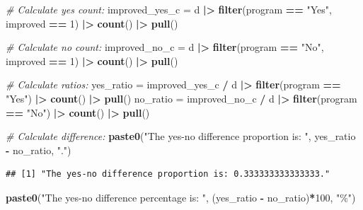 \documentclass[
]{article}
\newenvironment{Shaded}{\begin{snugshade}}{\end{snugshade}}
\newcommand{\CommentTok}[1]{\textcolor[rgb]{0.56,0.35,0.01}{\textit{#1}}}
\newcommand{\DecValTok}[1]{\textcolor[rgb]{0.00,0.00,0.81}{#1}}
\newcommand{\FunctionTok}[1]{\textcolor[rgb]{0.13,0.29,0.53}{\textbf{#1}}}
\newcommand{\NormalTok}[1]{#1}
\newcommand{\OtherTok}[1]{\textcolor[rgb]{0.56,0.35,0.01}{#1}}
\newcommand{\SpecialCharTok}[1]{\textcolor[rgb]{0.81,0.36,0.00}{\textbf{#1}}}
\newcommand{\StringTok}[1]{\textcolor[rgb]{0.31,0.60,0.02}{#1}}
\begin{document}
\begin{Shaded}
\begin{Highlighting}[]
\CommentTok{\# Calculate yes count:}
\NormalTok{improved\_yes\_c }\OtherTok{=}\NormalTok{ d }\SpecialCharTok{|\textgreater{}} 
  \FunctionTok{filter}\NormalTok{(program }\SpecialCharTok{==} \StringTok{"Yes"}\NormalTok{, improved }\SpecialCharTok{==} \DecValTok{1}\NormalTok{) }\SpecialCharTok{|\textgreater{}} 
  \FunctionTok{count}\NormalTok{() }\SpecialCharTok{|\textgreater{}} 
  \FunctionTok{pull}\NormalTok{()}

\CommentTok{\# Calculate no count:}
\NormalTok{improved\_no\_c }\OtherTok{=}\NormalTok{ d }\SpecialCharTok{|\textgreater{}} 
  \FunctionTok{filter}\NormalTok{(program }\SpecialCharTok{==} \StringTok{"No"}\NormalTok{, improved }\SpecialCharTok{==} \DecValTok{1}\NormalTok{) }\SpecialCharTok{|\textgreater{}} 
  \FunctionTok{count}\NormalTok{() }\SpecialCharTok{|\textgreater{}} 
  \FunctionTok{pull}\NormalTok{()}

\CommentTok{\# Calculate ratios:}
\NormalTok{yes\_ratio }\OtherTok{=}\NormalTok{ improved\_yes\_c }\SpecialCharTok{/}\NormalTok{ d }\SpecialCharTok{|\textgreater{}} \FunctionTok{filter}\NormalTok{(program }\SpecialCharTok{==} \StringTok{"Yes"}\NormalTok{) }\SpecialCharTok{|\textgreater{}} \FunctionTok{count}\NormalTok{() }\SpecialCharTok{|\textgreater{}} \FunctionTok{pull}\NormalTok{()}
\NormalTok{no\_ratio }\OtherTok{=}\NormalTok{ improved\_no\_c }\SpecialCharTok{/}\NormalTok{ d }\SpecialCharTok{|\textgreater{}} \FunctionTok{filter}\NormalTok{(program }\SpecialCharTok{==} \StringTok{"No"}\NormalTok{) }\SpecialCharTok{|\textgreater{}} \FunctionTok{count}\NormalTok{() }\SpecialCharTok{|\textgreater{}} \FunctionTok{pull}\NormalTok{()}

\CommentTok{\# Calculate difference:}
\FunctionTok{paste0}\NormalTok{(}\StringTok{"The yes{-}no difference proportion is: "}\NormalTok{, yes\_ratio }\SpecialCharTok{{-}}\NormalTok{ no\_ratio, }\StringTok{"."}\NormalTok{)}
\end{Highlighting}
\end{Shaded}

\begin{verbatim}
## [1] "The yes-no difference proportion is: 0.333333333333333."
\end{verbatim}

\begin{Shaded}
\begin{Highlighting}[]
\FunctionTok{paste0}\NormalTok{(}\StringTok{"The yes{-}no difference percentage is: "}\NormalTok{, (yes\_ratio }\SpecialCharTok{{-}}\NormalTok{ no\_ratio)}\SpecialCharTok{*}\DecValTok{100}\NormalTok{, }\StringTok{"\%"}\NormalTok{)}
\end{Highlighting}
\end{Shaded}
\end{document}
